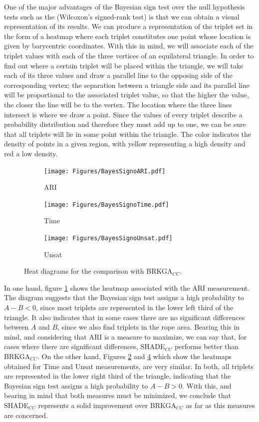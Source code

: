\documentclass[review]{elsarticle}
\begin{document}
One of the major advantages of the Bayesian sign test over the null hypothesis tests such as the (Wilcoxon's signed-rank test) is that we can obtain a visual representation of its results. We can produce a representation of the triplet set in the form of a heatmap where each triplet constitutes one point whose location is given by barycentric coordinates. With this in mind, we will associate each of the triplet values with each of the three vertices of an equilateral triangle. In order to find out where a certain triplet will be placed within the triangle, we will take each of its three values and draw a parallel line to the opposing side of the corresponding vertex; the separation between a triangle side and its parallel line will be proportional to the associated triplet value, so that the higher the value, the closer the line will be to the vertex. The location where the three lines intersect is where we draw a point. Since the values of every triplet describe a probability distribution and therefore they must add up to one, we can be sure that all triplets will lie in some point within the triangle. The color indicates the density of points in a given region, with yellow representing a high density and red a low density.

\begin{figure}[ht!]
	\centering
	\begin{subfigure}{.45\textwidth}
		\texttt{[image: Figures/BayesSignoARI.pdf]}
		\caption{ARI}
		\label{fig:bayesARI}
	\end{subfigure}
	\begin{subfigure}{.45\textwidth}
		\texttt{[image: Figures/BayesSignoTime.pdf]}
		\caption{Time}
		\label{fig:bayesTime}
	\end{subfigure}
	\begin{subfigure}{.45\textwidth}
		\texttt{[image: Figures/BayesSignoUnsat.pdf]}
		\caption{Unsat}
		\label{fig:bayesUnsat}
	\end{subfigure}
	\caption{Heat diagrams for the comparison with BRKGA$_{CC}$.}
\end{figure}

In one hand, figure \ref{fig:bayesARI} shows the heatmap associated with the ARI measurement. The diagram suggests that the Bayesian sign test assigns a high probability to $A - B < 0$, since most triplets are represented in the lower left third of the triangle. It also indicates that in some cases there are no significant differences between $A$ and $B$, since we also find triplets in the rope area. Bearing this in mind, and considering that ARI is a measure to maximize, we can say that, for cases where there are significant differences, SHADE$_{CC}$ performs better than BRKGA$_{CC}$. On the other hand, Figures \ref{fig:bayesTime} and \ref{fig:bayesUnsat} which show the heatmaps obtained for Time and Unsat measurements, are very similar. In both, all triplets are represented in the lower right third of the triangle, indicating that the Bayesian sign test assigns a high probability to $A - B > 0$. With this, and bearing in mind that both measures must be minimized, we conclude that SHADE$_{CC}$ represents a solid improvement over BRKGA$_{CC}$ as far as this measures are concerned.
\end{document}
